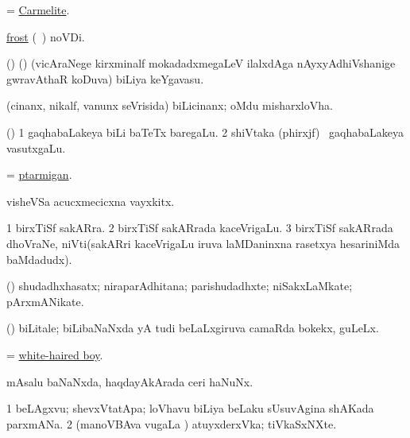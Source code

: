\bentry
{}
\gl{\nA}
\bmng
= \hyperref{kandict_c.pdf}{C}{Carmelite}{Carmelite}. 
\emng
\eentry

\bentry
{} 
\gl{\nA}
\expl{}
\bmng
\hyperref{kandict_f.pdf}{F}{frost pagu(5)}{frost} (\pagu\ ) noVDi. 
\emng
\eentry

\bentry
{}
\gl{\nA}
\bmng
(\birx) (\ca) (vicAraNege kirxminalf mokadadxmegaLeV ilalxdAga nAyxyAdhiVshanige gwravAthaR koDuva) biLiya keYgavasu. 
\emng
\eentry

\bentry
{}
\gl{\nA}
\bmng
(cinanx, nikalf, \mo vanunx seVrisida) biLicinanx; oMdu misharxloVha. 
\emng
\eentry

\bentry
{}
\gl{\nA}
\bmng
(\ame) 
\bnum
\num{1} gaqhabaLakeya biLi baTeTx baregaLu. 
\num{2} shiVtaka (phirxjf) \mo\ gaqhabaLakeya vasutxgaLu. 
\enum
\emng
\eentry

\bentry
{}
\gl{\nA}
\bmng
= \hyperref{kandict_p.pdf}{P}{ptarmigan}{ptarmigan}. 
\emng
\eentry

\bentry
{}
\gl{\nA}
\bmng
visheVSa acucxmecicxna vayxkitx. 
\emng
\eentry

\bentry
{}
\gl{\nA}
\bmng
\bnum
\num{1} birxTiSf sakARra. 
\num{2} birxTiSf sakARrada kaceVrigaLu. 
\num{3} birxTiSf sakARrada dhoVraNe, niVti(sakARri kaceVrigaLu iruva laMDaninxna rasetxya hesariniMda baMdadudx). 
\enum
\emng
\eentry

\bentry
{}
\gl{\nA}
\bmng
(\rUpa) shudadhxhasatx; niraparAdhitana; parishudadhxte; niSakxLaMkate; pArxmANikate. 
\emng
\eentry

\bentry
{}
\gl{\nA}
\bmng
(\AmA) biLitale; biLibaNaNxda yA tudi beLaLxgiruva camaRda bokekx, guLeLx. 
\emng
\eentry

\bentry
{}
\gl{\nA}
\bmng
= \hyperlink{white-haired boy}{white-haired boy}. 
\emng
\eentry

\bentry
{}
\gl{\nA}
\bmng
mAsalu baNaNxda, haqdayAkArada ceri haNuNx. 
\emng
\eentry

\bentry
{}
\gl{\nA}
\bmng
\bnum
\num{1} beLAgxvu; shevxVtatApa; loVhavu biLiya beLaku sUsuvAgina shAKada parxmANa. 
\num{2} (manoVBAva \mo vugaLa \vi) atuyxderxVka; tiVkaSxNXte. 
\enum
\emng
\eentry

